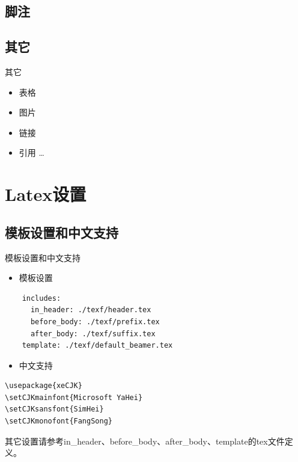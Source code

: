 \documentclass[10pt,ignorenonframetext,aspectratio=169,t,]{beamer} %
\providecommand{\tightlist}{%
  \setlength{\itemsep}{0pt}\setlength{\parskip}{0pt}}
\begin{document}
\subsection{脚注}


\subsection{其它}

\begin{frame}{其它}

\begin{itemize}
\tightlist
\item
  表格
\item
  图片
\item
  链接
\item
  引用 \ldots{}
\end{itemize}

\end{frame}

\section{Latex设置}\label{latex}

\subsection{模板设置和中文支持}

\begin{frame}[fragile]{模板设置和中文支持}

\begin{itemize}
\tightlist
\item
  模板设置
\end{itemize}

\begin{verbatim}
    includes:
      in_header: ./texf/header.tex
      before_body: ./texf/prefix.tex
      after_body: ./texf/suffix.tex
    template: ./texf/default_beamer.tex
\end{verbatim}

\begin{itemize}
\tightlist
\item
  中文支持
\end{itemize}

\begin{verbatim}
\usepackage{xeCJK}
\setCJKmainfont{Microsoft YaHei}
\setCJKsansfont{SimHei}
\setCJKmonofont{FangSong}
\end{verbatim}

其它设置请参考in\_header、before\_body、after\_body、template的tex文件定义。

\end{frame}
\end{document}
